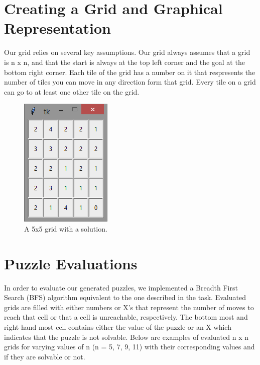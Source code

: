 \documentclass[12pt]{article}
\begin{document}
\section*{Creating a Grid and Graphical Representation}

Our grid relies on several key assumptions. Our grid always assumes that a grid is n x n, and that the start is always at the top left corner and the goal at the bottom right corner. Each tile of the grid has a number on it that respresents the number of tiles you can move in any direction form that grid. Every tile on a grid can go to at least one other tile on the grid.

\begin{figure}[H]
    \centering
    \includegraphics[width=0.3\linewidth]{basic_5x5_solvable}
    \caption{A 5x5 grid with a solution.}
    \label{fig:5x5_solution}
\end{figure}

\section*{Puzzle Evaluations}

In order to evaluate our generated puzzles, we implemented a Breadth First Search (BFS) algorithm equivalent to the one described in the task. Evaluated grids are filled with either numbers or X's that represent the number of moves to reach that cell or that a cell is unreachable, respectively. The bottom most and right hand most cell contains either the value of the puzzle or an X which indicates that the puzzle is not solvable. Below are examples of evaluated n x n grids for varying values of n (n = 5, 7, 9, 11) with their corresponding values and if they are solvable or not.
\end{document}
